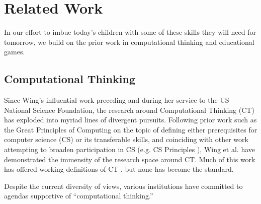 \documentclass{acm_proc_article-sp}
\begin{document}
\section{\sloppy Related Work}
\label{sec:ed_games}
In our effort to imbue today's children with some of these skills they will need for tomorrow, we build on the prior work in computational thinking and educational games.

\subsection{Computational Thinking}
\label{sec:computational_thinking}

Since Wing's influential work preceding \cite{wing2006computational} and during \cite{wing2008computational} her service to the US National Science Foundation, the research around Computational Thinking (CT) has exploded into myriad lines of divergent pursuits. 
Following prior work such as the Great Principles of Computing \cite{denning2003great} on the topic of defining either prerequisites for computer science (CS) or its transferable skills, and coinciding with other work attempting to broaden participation in CS (e.g. CS Principles \cite{csprinciples}), Wing et al. have demonstrated the immensity of the research space around CT. 
Much of this work has offered working definitions of CT \cite{allan2010computational,barr2011bringing,national2010report}, but none has become the standard.

Despite the current diversity of views, various institutions have committed to agendas supportive of ``computational thinking.''
\end{document}
